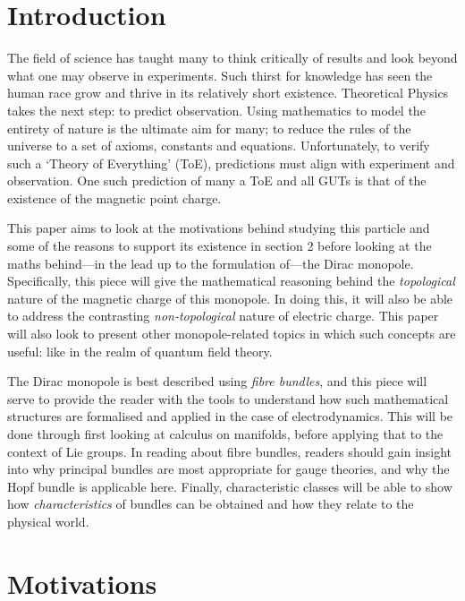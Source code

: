 \documentclass[fleqn, twocolumn, 10pt]{article}
\begin{document}
\section{Introduction}

The field of science has taught many to think critically of results and look beyond what one may observe in experiments. Such thirst for knowledge has seen the human race grow and thrive in its relatively short existence. Theoretical Physics takes the next step: to predict observation. Using mathematics to model the entirety of nature is the ultimate aim for many; to reduce the rules of the universe to a set of axioms, constants and equations. Unfortunately, to verify such a `Theory of Everything' (ToE), predictions must align with experiment and observation. One such prediction of many a ToE and all GUTs is that of the existence of the magnetic point charge.

This paper aims to look at the motivations behind studying this particle and some of the reasons to support its existence in section 2 before looking at the maths behind---in the lead up to the formulation of---the Dirac monopole. Specifically, this piece will give the mathematical reasoning behind the \textit{topological} nature of the magnetic charge of this monopole. In doing this, it will also be able to address the contrasting \textit{non-topological} nature of electric charge. This paper will also look to present other monopole-related topics in which such concepts are useful: like in the realm of quantum field theory. 

The Dirac monopole is best described using \textit{fibre bundles}, and this piece will serve to provide the reader with the tools to understand how such mathematical structures are formalised and applied in the case of electrodynamics. This will be done through first looking at calculus on manifolds, before applying that to the context of Lie groups. In reading about fibre bundles, readers should gain insight into why principal bundles are most appropriate for gauge theories, and why the Hopf bundle is applicable here. Finally, characteristic classes will be able to show how \textit{characteristics} of bundles can be obtained and how they relate to the physical world.


\section{Motivations}
\end{document}
